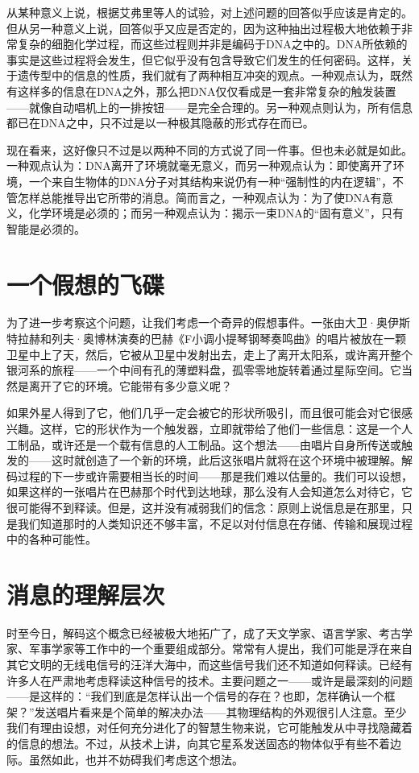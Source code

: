 从某种意义上说，根据艾弗里等人的试验，对上述问题的回答似乎应该是肯定的。但从另一种意义上说，回答似乎又应是否定的，因为这种抽出过程极大地依赖于非常复杂的细胞化学过程，而这些过程则并非是编码于DNA之中的。DNA所依赖的事实是这些过程将会发生，但它似乎没有包含导致它们发生的任何密码。这样，关于遗传型中的信息的性质，我们就有了两种相互冲突的观点。一种观点认为，既然有这样多的信息在DNA之外，那么把DNA仅仅看成是一套非常复杂的触发装置——就像自动唱机上的一排按钮——是完全合理的。另一种观点则认为，所有信息都已在DNA之中，只不过是以一种极其隐蔽的形式存在而已。

现在看来，这好像只不过是以两种不同的方式说了同一件事。但也未必就是如此。一种观点认为：DNA离开了环境就毫无意义，而另一种观点认为：即使离开了环境，一个来自生物体的DNA分子对其结构来说仍有一种“强制性的内在逻辑”，不管怎样总能推导出它所带的消息。简而言之，一种观点认为：为了使DNA有意义，化学环境是必须的；而另一种观点认为：揭示一束DNA的“固有意义”，只有智能是必须的。

\section{一个假想的飞碟}

为了进一步考察这个问题，让我们考虑一个奇异的假想事件。一张由大卫·奥伊斯特拉赫和列夫·奥博林演奏的巴赫《F小调小提琴钢琴奏鸣曲》的唱片被放在一颗卫星中上了天，然后，它被从卫星中发射出去，走上了离开太阳系，或许离开整个银河系的旅程——一个中间有孔的薄塑料盘，孤零零地旋转着通过星际空间。它当然是离开了它的环境。它能带有多少意义呢？

如果外星人得到了它，他们几乎一定会被它的形状所吸引，而且很可能会对它很感兴趣。这样，它的形状作为一个触发器，立即就带给了他们一些信息：这是一个人工制品，或许还是一个载有信息的人工制品。这个想法——由唱片自身所传送或触发的——这时就创造了一个新的环境，此后这张唱片就将在这个环境中被理解。解码过程的下一步或许需要相当长的时间——那是我们难以估量的。我们可以设想，如果这样的一张唱片在巴赫那个时代到达地球，那么没有人会知道怎么对待它，它很可能得不到释读。但是，这并没有减弱我们的信念：原则上说信息是在那里，只是我们知道那时的人类知识还不够丰富，不足以对付信息在存储、传输和展现过程中的各种可能性。

\section{消息的理解层次}

时至今日，解码这个概念已经被极大地拓广了，成了天文学家、语言学家、考古学家、军事学家等工作中的一个重要组成部分。常常有人提出，我们可能是浮在来自其它文明的无线电信号的汪洋大海中，而这些信号我们还不知道如何释读。已经有许多人在严肃地考虑释读这种信号的技术。主要问题之一——或许是最深刻的问题——是这样的：“我们到底是怎样认出一个信号的存在？也即，怎样确认一个框架？”发送唱片看来是个简单的解决办法——其物理结构的外观很引人注意。至少我们有理由设想，对任何充分进化了的智慧生物来说，它可能触发从中寻找隐藏着的信息的想法。不过，从技术上讲，向其它星系发送固态的物体似乎有些不着边际。虽然如此，也并不妨碍我们考虑这个想法。

